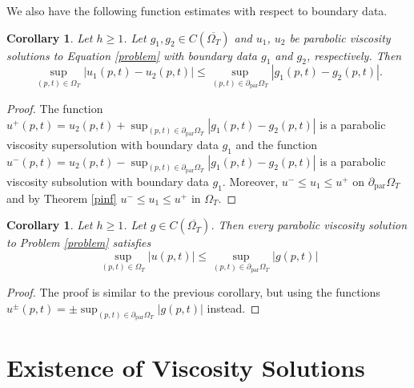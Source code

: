 \documentclass[12pt]{amsart}
\newtheorem{corollary}[thm]{Corollary}
\theoremstyle{definition}
\theoremstyle{remark}
\numberwithin{equation}{section}
\begin{document}
We also have the following function estimates with respect to boundary data. 
\begin{corollary}
Let $h\geq1$. Let $g_1, g_2 \in C(\overline{\Omega_T})$ and $u_1$, $u_2$ be parabolic viscosity  solutions to Equation \ref{problem} 
with boundary data $g_1$ and $g_2$, respectively. Then
$$\sup_{(p,t)\in\Omega_T}|u_1(p,t)-u_2(p,t)|\leq \sup_{(p,t)\in\partial_{\operatorname{par}}\Omega_T}|g_1(p,t)-g_2(p,t)|.  $$
\end{corollary}
\begin{proof}
The function $u^+(p,t)=u_2(p,t)+\sup_{(p,t)\in\partial_{\operatorname{par}}\Omega_T}|g_1(p,t)-g_2(p,t)|$ is a parabolic viscosity supersolution with boundary data $g_1$ and the function $u^-(p,t)=u_2(p,t)-\sup_{(p,t)\in\partial_{\operatorname{par}}\Omega_T}|g_1(p,t)-g_2(p,t)|$ is a parabolic viscosity subsolution with boundary data $g_1$. Moreover, $u^- \leq u_1 \leq u^+$ on $\partial_{\operatorname{par}}\Omega_T$ and by Theorem \ref{pinf} 
$u^- \leq u_1 \leq u^+$ in $\Omega_T$.
\end{proof}
\begin{corollary}
Let $h\geq1$. Let $g\in C(\overline{\Omega_T})$. Then every parabolic viscosity solution to Problem \ref{problem} 
satisfies $$\sup_{(p,t)\in\Omega_T}|u(p,t)|\leq \sup_{(p,t)\in\partial_{\operatorname{par}}\Omega_T}|g(p,t)|$$
\end{corollary}
\begin{proof}
The proof is similar to the previous corollary, but using the functions $u^\pm(p,t)=\pm\sup_{(p,t)\in\partial_{\operatorname{par}}\Omega_T}|g(p,t)|$ instead. 
\end{proof}

\section{Existence of Viscosity Solutions}
\end{document}
